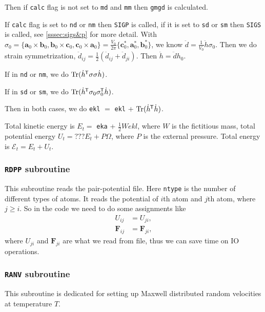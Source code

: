 Then if \texttt{calc} flag is not set to \texttt{md} and \texttt{mm}
then \texttt{gmgd} is calculated.

If \texttt{calc} flag is set to \texttt{nd} or \texttt{nm}
then \texttt{SIGP} is called, if it is set to \texttt{sd} or
\texttt{sm} then \texttt{SIGS} is called, see \ref{sssec:sigs&p}
for more detail.
With
$\sigma_0 = 
\{
\bm{a}_0 \times \bm{b}_0, \bm{b}_0 \times \bm{c}_0,
\bm{c}_0 \times \bm{a}_0 
\}
= \frac{ V_0 }{ 2\pi } \{
\bm{c}^\ast_0, \bm{a}^\ast_0, \bm{b}^\ast_0
\}$,
we know
$\ddot{d} = \frac{ 1 }{ V_0 }\ddot{h} \sigma_0$.
Then we do strain symmetrization, $\ddot{d}_{ij} = \frac{ 1 }{ 2 }
(\ddot{d}_{ij} + \ddot{d}_{ji})$.
Then $\ddot{h} = \ddot{d} h_0$.

If in \texttt{nd} or \texttt{nm}, we do 
$\operatorname{Tr} (\dot{h}^{\mkern-1.5mu\mathsf{T}} \sigma \sigma \dot{h})$.

If in \texttt{sd} or \texttt{sm}, we do 
$\operatorname{Tr}(\dot{h}^{\mkern-1.5mu\mathsf{T}} \sigma_0 \sigma_0^{\mkern-1.5mu\mathsf{T}} \dot{ h })$.

Then in both cases, we do
\texttt{ekl} $=$ \texttt{ekl} + $\operatorname{Tr} (\dot{ h }^{\mkern-1.5mu\mathsf{T}} \dot{ h })$.

Total kinetic energy is $E_{t} = $ \texttt{eka} + $\frac{ 1 }{ 2 } W ekl$,
where $W$ is the fictitious mass,
total potential energy $U_{t} = ???E_{t} + P \Omega$, where $P$ is the external pressure.
Total energy is $\mathscr{E}_{t} = E_t + U_{t}$.


\subsubsection{\texttt{RDPP} subroutine}

This subroutine reads the pair-potential file.
Here \texttt{ntype} is the number of different types of atoms.
It reads the potential of $i$th atom and $j$th atom, where $j \geq i$.
So in the code we need to do some assignments like
\begin{align}
	U_{ij}      & = U_{ji},      \\
	\bm{F}_{ij} & = \bm{F}_{ji},
\end{align}
where $U_{ji}$ and $\bm{F}_{ji}$ are what we read from file,
thus we can save time on IO operations.


\subsubsection{\texttt{RANV} subroutine}

This subroutine is dedicated for setting up Maxwell distributed random velocities
at temperature $T$.


